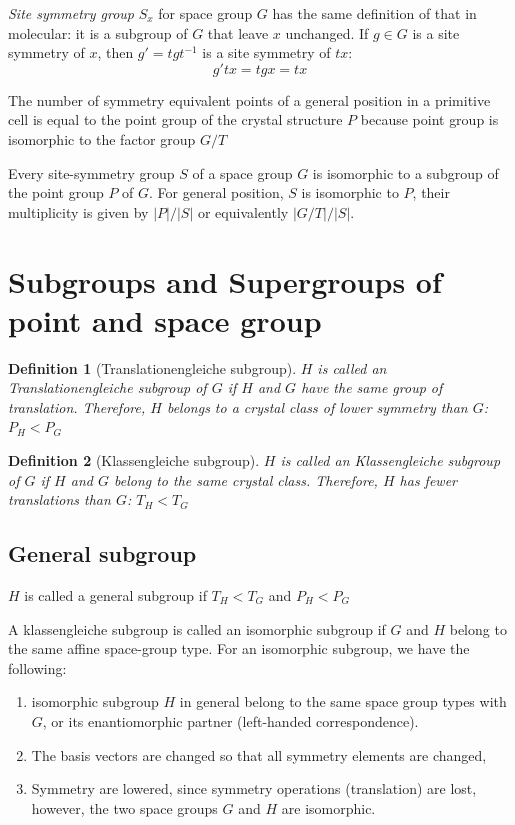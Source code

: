 \documentclass{amsart}
\newtheorem{definition}{Definition}
\begin{document}
\vspace{10pt}

\emph{Site symmetry group} $S_x$ for space group $G$ has the same definition of that in molecular: it is 
a subgroup of $G$ that leave $x$ unchanged. 
If $g\in G$ is a site symmetry of $x$, then $g' = tgt^{-1}$ is a site symmetry of $tx$:
\begin{equation}
    g'tx = tgx = tx
\end{equation}

The number of symmetry equivalent points of a general position in a primitive cell is equal to the point 
group of the crystal structure $P$ because point group is isomorphic to the factor group $G/T$

Every site-symmetry group $S$ of a space group $G$ is isomorphic to a subgroup of the point group $P$ of $G$. 
For general position, $S$ is isomorphic to $P$, their multiplicity is given by $|P|/|S|$ or equivalently $|G/T|/|S|$.

\section{Subgroups and Supergroups of point and space group}
\begin{definition}
    [Translationengleiche subgroup]
    $H$ is called an \emph{Translationengleiche subgroup} of $G$ if $H$ and $G$ have the same group of translation. 
    Therefore, $H$ belongs to a crystal class of lower symmetry than $G$: $P_H < P_G$
\end{definition}

\begin{definition}
    [Klassengleiche subgroup]
    $H$ is called an \emph{Klassengleiche subgroup} of $G$ if $H$ and $G$ belong to the same crystal class. 
    Therefore, $H$ has fewer translations than $G$: $T_H < T_G$
\end{definition}

\subsection*{General subgroup}
$H$ is called a general subgroup if $T_H < T_G$ and $P_H < P_G$

A klassengleiche subgroup is called an isomorphic subgroup if $G$ and $H$ belong to the same affine space-group type. 
For an isomorphic subgroup, we have the following:
\begin{enumerate}
    \item isomorphic subgroup $H$ in general belong to the same space group types with $G$, or its enantiomorphic partner (left-handed correspondence).
    \item The basis vectors are changed so that all symmetry elements are changed,
    \item Symmetry are lowered, since symmetry operations (translation) are lost, however, the two space groups $G$ and $H$ are isomorphic.
\end{enumerate}
\end{document}
